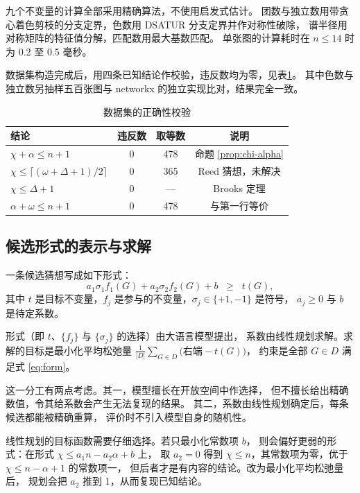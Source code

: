九个不变量的计算全部采用精确算法，不使用启发式估计。
团数与独立数用带贪心着色剪枝的分支定界，色数用 DSATUR 分支定界并作对称性破除，
谱半径用对称矩阵的特征值分解，匹配数用最大基数匹配。
单张图的计算耗时在 $n \leq 14$ 时为 0.2 至 0.5 毫秒。

数据集构造完成后，用四条已知结论作校验，违反数均为零，见表\ref{tab:validate}。
其中色数与独立数另抽样五百张图与 networkx 的独立实现比对，结果完全一致。

\begin{table}[H]
\centering
\small
\caption{数据集的正确性校验}
\label{tab:validate}
\begin{tabular}{@{}lccc@{}}
\toprule
结论 & 违反数 & 取等数 & 说明 \\
\midrule
$\chi + \alpha \leq n + 1$ & 0 & 478 & 命题 \ref{prop:chi-alpha} \\
$\chi \leq \lceil (\omega+\Delta+1)/2 \rceil$ & 0 & 365 & Reed 猜想，未解决 \\
$\chi \leq \Delta + 1$ & 0 & --- & Brooks 定理 \\
$\alpha + \omega \leq n + 1$ & 0 & 478 & 与第一行等价 \\
\bottomrule
\end{tabular}
\end{table}

\subsection{候选形式的表示与求解}

一条候选猜想写成如下形式：
\begin{equation}
  a_1 \sigma_1 f_1(G) + a_2 \sigma_2 f_2(G) + b \;\; \geq\;\; t(G),
  \label{eq:form}
\end{equation}
其中 $t$ 是目标不变量，$f_j$ 是参与的不变量，$\sigma_j \in \{+1,-1\}$ 是符号，
$a_j \geq 0$ 与 $b$ 是待定系数。

形式（即 $t$、$\{f_j\}$ 与 $\{\sigma_j\}$ 的选择）由大语言模型提出，
系数由线性规划求解。求解的目标是最小化平均松弛量
$\frac{1}{|D|}\sum_{G \in D}\bigl(\text{右端} - t(G)\bigr)$，
约束是全部 $G \in D$ 满足式 \eqref{eq:form}。

这一分工有两点考虑。其一，模型擅长在开放空间中作选择，
但不擅长给出精确数值，令其给系数会产生无法复现的结果。
其二，系数由线性规划确定后，每条候选都能被精确重算，
评价时不引入模型自身的随机性。

线性规划的目标函数需要仔细选择。若只最小化常数项 $b$，
则会偏好更弱的形式：在形式 $\chi \leq a_1 n - a_2 \alpha + b$ 上，
取 $a_2 = 0$ 得到 $\chi \leq n$，其常数项为零，优于 $\chi \leq n-\alpha+1$ 的常数项一，
但后者才是有内容的结论。改为最小化平均松弛量后，
规划会把 $a_2$ 推到 1，从而复现已知结论。

